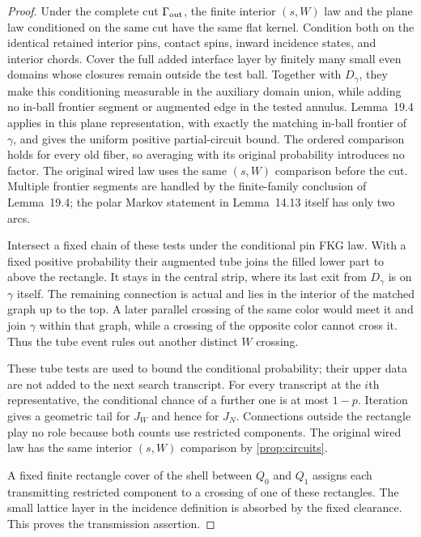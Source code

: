 \begin{proof}
Under the complete cut $\Gamma_{\rm out}$, the finite interior
$(s,W)$ law and the plane law conditioned on the same cut have the
same flat kernel. Condition both on the identical retained interior
pins, contact spins, inward incidence states, and interior chords.
Cover the full added interface layer by finitely many small even
domains whose closures remain outside the test ball. Together with
$D_\gamma$, they make this conditioning measurable in the auxiliary
domain union, while adding no in-ball frontier segment or augmented
edge in the tested annulus. Lemma~19.4 applies in this plane
representation, with exactly the matching in-ball frontier of
$\gamma$, and gives the uniform positive partial-circuit bound.
The ordered comparison holds for every old fiber, so averaging with
its original probability introduces no factor. The original wired law
uses the same $(s,W)$ comparison before the cut. Multiple frontier
segments are handled by the finite-family conclusion of Lemma~19.4;
the polar Markov statement in Lemma~14.13 itself has only two arcs.

Intersect a fixed chain of these tests under the conditional pin
FKG law. With a fixed positive probability their augmented tube
joins the filled lower part to above the rectangle. It stays in
the central strip, where its last exit from $D_\gamma$ is on
$\gamma$ itself. The remaining connection is actual and lies in
the interior of the matched graph up to the top. A later parallel
crossing of the same color would meet it and join $\gamma$ within
that graph, while a crossing of the opposite color cannot cross it.
Thus the tube event rules out another distinct $W$ crossing.

These tube tests are used to bound the conditional probability;
their upper data are not added to the next search transcript.
For every transcript at the $i$th representative,
the conditional chance of a further one is at most $1-p$.
Iteration gives a geometric tail for $J_W$ and hence for $J_N$.
Connections outside the rectangle play no role because both counts
use restricted components. The original wired law has the same
interior $(s,W)$ comparison by \cref{prop:circuits}.

A fixed finite rectangle cover of the shell between $Q_0$ and $Q_1$
assigns each transmitting restricted component to a crossing of one
of these rectangles. The small lattice layer in the incidence
definition is absorbed by the fixed clearance. This proves the
transmission assertion.


\end{proof}
